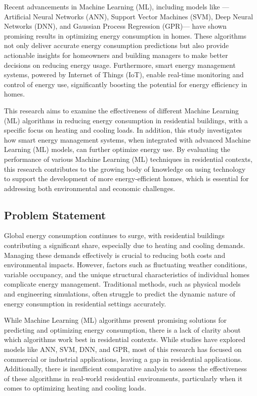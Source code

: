 \documentclass[a4paper, 12pt]{article}
\begin{document}
\quad Recent advancements in Machine Learning (ML), including models like —Artificial Neural Networks (ANN), Support Vector Machines (SVM), Deep Neural Networks (DNN), and Gaussian Process Regression (GPR)— have shown promising results in optimizing energy consumption in homes. These algorithms not only deliver accurate energy consumption predictions but also provide actionable insights for homeowners and building managers to make better decisions on reducing energy usage. Furthermore, smart energy management systems, powered by Internet of Things (IoT), enable real-time monitoring and control of energy use, significantly boosting the potential for energy efficiency in homes.
\vspace{7pt}

\quad This research aims to examine the effectiveness of different Machine Learning (ML) algorithms in reducing energy consumption in residential buildings, with a specific focus on heating and cooling loads. In addition, this study investigates how smart energy management systems, when integrated with advanced Machine Learning (ML) models, can further optimize energy use. By evaluating the performance of various Machine Learning (ML) techniques in residential contexts, this research contributes to the growing body of knowledge on using technology to support the development of more energy-efficient homes, which is essential for addressing both environmental and economic challenges.

\subsection{Problem Statement}
\quad Global energy consumption continues to surge, with residential buildings contributing a significant share, especially due to heating and cooling demands. Managing these demands effectively is crucial to reducing both costs and environmental impacts. However, factors such as fluctuating weather conditions, variable occupancy, and the unique structural characteristics of individual homes complicate energy management. Traditional methods, such as physical models and engineering simulations, often struggle to predict the dynamic nature of energy consumption in residential settings accurately.
\vspace{7pt}

\quad While Machine Learning (ML) algorithms present promising solutions for predicting and optimizing energy consumption, there is a lack of clarity about which algorithms work best in residential contexts. While studies have explored models like ANN, SVM, DNN, and GPR, most of this research has focused on commercial or industrial applications, leaving a gap in residential applications. Additionally, there is insufficient comparative analysis to assess the effectiveness of these algorithms in real-world residential environments, particularly when it comes to optimizing heating and cooling loads.
\vspace{7pt}
\end{document}
